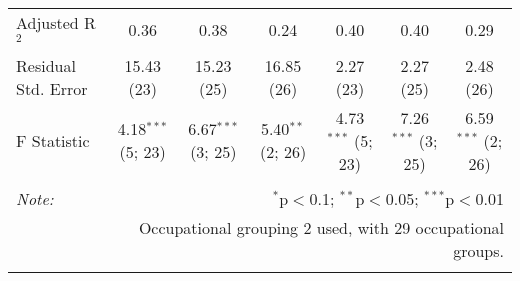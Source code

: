 \begin{sidewaystable}[!htbp]
\begin{tabular}{@{\extracolsep{0pt}}lcccccc}
Adjusted R$^{2}$ & 0.36 & 0.38 & 0.24 & 0.40 & 0.40 & 0.29 \\ 
Residual Std. Error & 15.43 (23) & 15.23 (25) & 16.85 (26) & 2.27 (23) & 2.27 (25) & 2.48 (26) \\ 
F Statistic & 4.18$^{***}$ (5; 23) & 6.67$^{***}$ (3; 25) & 5.40$^{**}$ (2; 26) & 4.73$^{***}$ (5; 23) & 7.26$^{***}$ (3; 25) & 6.59$^{***}$ (2; 26) \\ 
\hline 
\hline \\[-1.8ex] 
\textit{Note:}  & \multicolumn{6}{r}{$^{*}$p$<$0.1; $^{**}$p$<$0.05; $^{***}$p$<$0.01} \\ 
 & \multicolumn{6}{r}{Occupational grouping 2 used, with 29 occupational groups.} \\ 
\normalsize 
\end{tabular} 
\end{sidewaystable} 

